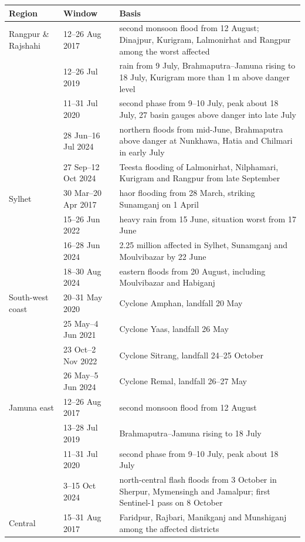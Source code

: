 \documentclass[10pt,a4paper,twocolumn]{article}
\begin{document}
\begin{table}[tp]
\centering
\small
\begin{tabularx}{\textwidth}{llX}
\toprule
Region & Window & Basis \\
\midrule
Rangpur \& Rajshahi & 12--26 Aug 2017 & second monsoon flood from 12 August; Dinajpur, Kurigram, Lalmonirhat and Rangpur among the worst affected \\
 & 12--26 Jul 2019 & rain from 9 July, Brahmaputra--Jamuna rising to 18 July, Kurigram more than 1\,m above danger level \\
 & 11--31 Jul 2020 & second phase from 9--10 July, peak about 18 July, 27 basin gauges above danger into late July \\
 & 28 Jun--16 Jul 2024 & northern floods from mid-June, Brahmaputra above danger at Nunkhawa, Hatia and Chilmari in early July \\
 & 27 Sep--12 Oct 2024 & Teesta flooding of Lalmonirhat, Nilphamari, Kurigram and Rangpur from late September \\
\midrule
Sylhet & 30 Mar--20 Apr 2017 & haor flooding from 28 March, striking Sunamganj on 1 April \\
 & 15--26 Jun 2022 & heavy rain from 15 June, situation worst from 17 June \\
 & 16--28 Jun 2024 & 2.25 million affected in Sylhet, Sunamganj and Moulvibazar by 22 June \\
 & 18--30 Aug 2024 & eastern floods from 20 August, including Moulvibazar and Habiganj \\
\midrule
South-west coast & 20--31 May 2020 & Cyclone Amphan, landfall 20 May \\
 & 25 May--4 Jun 2021 & Cyclone Yaas, landfall 26 May \\
 & 23 Oct--2 Nov 2022 & Cyclone Sitrang, landfall 24--25 October \\
 & 26 May--5 Jun 2024 & Cyclone Remal, landfall 26--27 May \\
Jamuna east & 12--26 Aug 2017 & second monsoon flood from 12 August \\
 & 13--28 Jul 2019 & Brahmaputra--Jamuna rising to 18 July \\
 & 11--31 Jul 2020 & second phase from 9--10 July, peak about 18 July \\
 & 3--15 Oct 2024 & north-central flash floods from 3 October in Sherpur, Mymensingh and Jamalpur; first Sentinel-1 pass on 8 October \\
Central & 15--31 Aug 2017 & Faridpur, Rajbari, Manikganj and Munshiganj among the affected districts \\

\end{tabularx}
\end{table}
\end{document}
